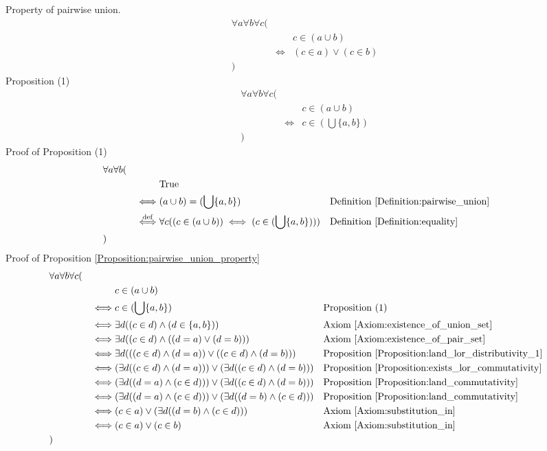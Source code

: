 \begin{prop}
\label{Proposition:pairwise_union_property}
Property of pairwise union.
\begin{align*}
& \forall a \forall b \forall c ( \\
& & & c \in (a \cup b) \\
& & \iff & (c \in a) \lor (c \in b) \\
& )
\end{align*}
Proposition (1)
\begin{align*}
& \forall a \forall b \forall c ( \\
& & & c \in (a \cup b) \\
& & \iff & c \in (\bigcup \{ a , b \}) \\
& )
\end{align*}
Proof of Proposition (1)
\begin{align*}
& \forall a \forall b ( \\
& & & \text{True} \\
& & \iff & (a \cup b) = (\bigcup \{ a , b \})
& & \text{Definition \ref{Definition:pairwise_union}} \\
& & \overset{\operatorname{def}}{\iff} & \forall c ((c \in (a \cup b)) \iff (c \in (\bigcup \{ a , b \})))
& & \text{Definition \ref{Definition:equality}} \\
& )
\end{align*}
Proof of Proposition \ref{Proposition:pairwise_union_property}
\begin{align*}
& \forall a \forall b \forall c ( \\
& & & c \in (a \cup b) \\
& & \iff & c \in (\bigcup \{ a , b \})
& & \text{Proposition (1)} \\
& & \iff & \exists d ((c \in d) \land (d \in \{ a , b \}))
& & \text{Axiom \ref{Axiom:existence_of_union_set}} \\
& & \iff & \exists d ((c \in d) \land ((d = a) \lor (d = b)))
& & \text{Axiom \ref{Axiom:existence_of_pair_set}} \\
& & \iff & \exists d (((c \in d) \land (d = a)) \lor ((c \in d) \land (d = b)))
& & \text{Proposition \ref{Proposition:land_lor_distributivity_1}} \\
& & \iff & (\exists d ((c \in d) \land (d = a))) \lor (\exists d ((c \in d) \land (d = b)))
& & \text{Proposition \ref{Proposition:exists_lor_commutativity}} \\
& & \iff & (\exists d ((d = a) \land (c \in d))) \lor (\exists d ((c \in d) \land (d = b)))
& & \text{Proposition \ref{Proposition:land_commutativity}} \\
& & \iff & (\exists d ((d = a) \land (c \in d))) \lor (\exists d ((d = b) \land (c \in d)))
& & \text{Proposition \ref{Proposition:land_commutativity}} \\
& & \iff & (c \in a) \lor (\exists d ((d = b) \land (c \in d)))
& & \text{Axiom \ref{Axiom:substitution_in}} \\
& & \iff & (c \in a) \lor (c \in b)
& & \text{Axiom \ref{Axiom:substitution_in}} \\
& )
\end{align*}
\end{prop}

